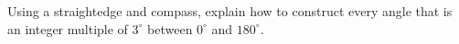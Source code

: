 Using a straightedge and compass, explain how to construct every angle that is an integer multiple of $ 3^\circ $ between $ 0^\circ $ and $ 180^\circ $.
